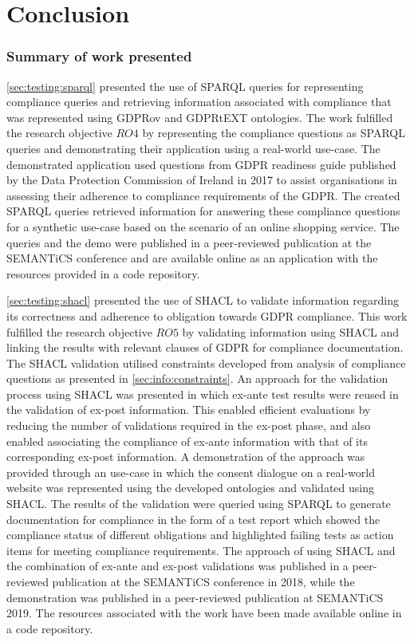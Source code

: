 \section{Conclusion}\label{sec:testing:conclusion}

\subsubsection{Summary of work presented}
\autoref{sec:testing:sparql} presented the use of SPARQL queries for representing compliance queries and retrieving information associated with compliance that was represented using GDPRov and GDPRtEXT ontologies.
The work fulfilled the research objective $RO4$ by representing the compliance questions as SPARQL queries and demonstrating their application using a real-world use-case.
The demonstrated application used questions from GDPR readiness guide published by the Data Protection Commission of Ireland in 2017 to assist organisations in assessing their adherence to compliance requirements of the GDPR.
The created SPARQL queries retrieved information for answering these compliance questions for a synthetic use-case based on the scenario of an online shopping service.
The queries and the demo were published in a peer-reviewed publication \cite{pandit_queryable_2018} at the SEMANTiCS conference and are available online as an application with the resources provided in a code repository.

\autoref{sec:testing:shacl} presented the use of SHACL to validate information regarding its correctness and adherence to obligation towards GDPR compliance.
This work fulfilled the research objective $RO5$ by validating information using SHACL and linking the results with relevant clauses of GDPR for compliance documentation.
The SHACL validation utilised constraints developed from analysis of compliance questions as presented in \autoref{sec:info:constraints}.
An approach for the validation process using SHACL was presented in which ex-ante test results were reused in the validation of ex-post information. This enabled efficient evaluations by reducing the number of validations required in the ex-post phase, and also enabled associating the compliance of ex-ante information with that of its corresponding ex-post information.
A demonstration of the approach was provided through an use-case in which the consent dialogue on a real-world website was represented using the developed ontologies and validated using SHACL.
The results of the validation were queried using SPARQL to generate documentation for compliance in the form of a test report which showed the compliance status of different obligations and highlighted failing tests as action items for meeting compliance requirements.
The approach of using SHACL and the combination of ex-ante and ex-post validations was published in a peer-reviewed publication \cite{pandit_towards_2018} at the SEMANTiCS conference in 2018, while the demonstration was published in a peer-reviewed publication \cite{pandit_test-driven_2019} at SEMANTiCS 2019.
The resources associated with the work have been made available online in a code repository.

